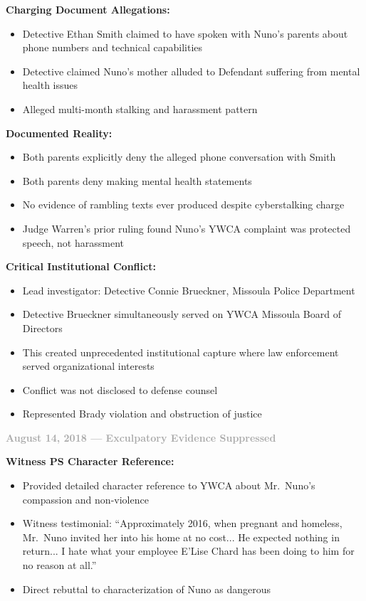 \documentclass[11pt, letterpaper]{article}
\newcommand{\subsubsectiontitle}[1]{\vspace{0.1in}\noindent\textcolor{DarkGray}{\textbf{#1}}\vspace{0.05in}}
\begin{document}
\textbf{Charging Document Allegations:}
\begin{itemize}[leftmargin=*,itemsep=2pt]
    \item Detective Ethan Smith claimed to have spoken with Nuno's parents about phone numbers and technical capabilities
    \item Detective claimed Nuno's mother alluded to Defendant suffering from mental health issues
    \item Alleged multi-month stalking and harassment pattern
\end{itemize}

\textbf{Documented Reality:}
\begin{itemize}[leftmargin=*,itemsep=2pt]
    \item Both parents explicitly deny the alleged phone conversation with Smith
    \item Both parents deny making mental health statements
    \item No evidence of rambling texts ever produced despite cyberstalking charge
    \item Judge Warren's prior ruling found Nuno's YWCA complaint was protected speech, not harassment
\end{itemize}

\textbf{Critical Institutional Conflict:}
\begin{itemize}[leftmargin=*,itemsep=2pt]
    \item Lead investigator: Detective Connie Brueckner, Missoula Police Department
    \item Detective Brueckner simultaneously served on YWCA Missoula Board of Directors
    \item This created unprecedented institutional capture where law enforcement served organizational interests
    \item Conflict was not disclosed to defense counsel
    \item Represented Brady violation and obstruction of justice
\end{itemize}

\subsubsectiontitle{August 14, 2018 --- Exculpatory Evidence Suppressed}

\textbf{Witness PS Character Reference:}
\begin{itemize}[leftmargin=*,itemsep=2pt]
    \item Provided detailed character reference to YWCA about Mr.\ Nuno's compassion and non-violence
    \item Witness testimonial: ``Approximately 2016, when pregnant and homeless, Mr.\ Nuno invited her into his home at no cost... He expected nothing in return... I hate what your employee E'Lise Chard has been doing to him for no reason at all.''
    \item Direct rebuttal to characterization of Nuno as dangerous
\end{itemize}
\end{document}
